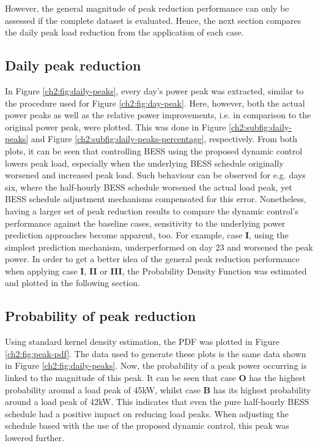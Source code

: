 

However, the general magnitude of peak reduction performance can only be assessed if the complete dataset is evaluated.
Hence, the next section compares the daily peak load reduction from the application of each case.

\subsection{Daily peak reduction}



In Figure \ref{ch2:fig:daily-peaks}, every day's power peak was extracted, similar to the procedure used for Figure \ref{ch2:fig:day-peak}.
Here, however, both the actual power peaks as well as the relative power improvements, i.e. in comparison to the original power peak, were plotted.
This was done in Figure \ref{ch2:subfig:daily-peaks} and Figure \ref{ch2:subfig:daily-peaks-percentage}, respectively.
From both plots, it can be seen that controlling BESS using the proposed dynamic control lowers peak load, especially when the underlying BESS schedule originally worsened and increased peak load.
Such behaviour can be observed for e.g. days six, where the half-hourly BESS schedule worsened the actual load peak, yet BESS schedule adjustment mechanisms compensated for this error.
Nonetheless, having a larger set of peak reduction results to compare the dynamic control's performance against the baseline cases, sensitivity to the underlying power prediction approaches become apparent, too.
For example, case \textbf{I}, using the simplest prediction mechanism, underperformed on day 23 and worsened the peak power.
In order to get a better idea of the general peak reduction performance when applying case \textbf{I}, \textbf{II} or \textbf{III}, the Probability Density Function was estimated and plotted in the following section.

\subsection{Probability of peak reduction}



Using standard kernel density estimation, the PDF was plotted in Figure \ref{ch2:fig:peak-pdf}.
The data used to generate these plots is the same data shown in Figure \ref{ch2:fig:daily-peaks}.
Now, the probability of a peak power occurring is linked to the magnitude of this peak.
It can be seen that case \textbf{O} has the highest probability around a load peak of 45kW, whilst case \textbf{B} has its highest probability around a load peak of 42kW.
This indicates that even the pure half-hourly BESS schedule had a positive impact on reducing load peaks.
When adjusting the schedule based with the use of the proposed dynamic control, this peak was lowered further.

